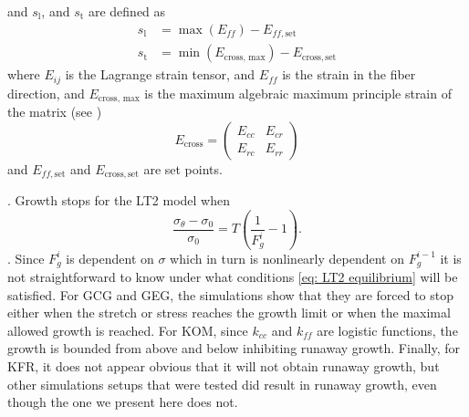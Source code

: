 and $s_\mathrm{l}$, and $s_\mathrm{t}$ are defined as
\begin{align*}
    s_\mathrm{l} &= \max(E_{ff}) - E_{ff, \mathrm{set}} \\
    s_\mathrm{t} &= \min(E_\text{cross, max}) - E_\mathrm{cross, set}
\end{align*}
where $E_{ij}$ is the Lagrange strain tensor, and $E_{ff}$ is the strain in the fiber direction, and $E_\text{cross, max}$ is the maximum algebraic maximum principle strain of the matrix (see \citep{Witzenburg2018})
\begin{equation*}
    E_\text{cross} = \begin{pmatrix}
        E_{cc} & E_{cr} \\
        E_{rc} & E_{rr}
    \end{pmatrix}
\end{equation*}
and $E_{ff, \mathrm{set}}$ and $E_\mathrm{cross, set}$ are set points. \par
{}\citep{Witzenburg2018}. Growth stops for the LT2 model when \begin{equation}
\label{eq: LT2 equilibrium}
    \frac{\sigma_{\theta} - \sigma_{0}}{\sigma_{0}} = T\left(\frac{1}{F_{g}^i} - 1\right).
\end{equation}
 \citep{Witzenburg2018}. Since $F_g^i$ is dependent on $\sigma$ which in turn is nonlinearly dependent on $F_g^{i-1}$ it is not straightforward to know under what conditions \ref{eq: LT2 equilibrium} will be satisfied. For GCG and GEG, the simulations show that they are forced to stop either when the stretch or stress reaches the growth limit or when the maximal allowed growth is reached. For KOM, since $k_{cc}$ and $k_{ff}$ are logistic functions, the growth is bounded from above and below inhibiting runaway growth. Finally, for KFR, it does not appear obvious that it will not obtain runaway growth, but other simulations setups that were tested did result in runaway growth, even though the one we present here does not.
